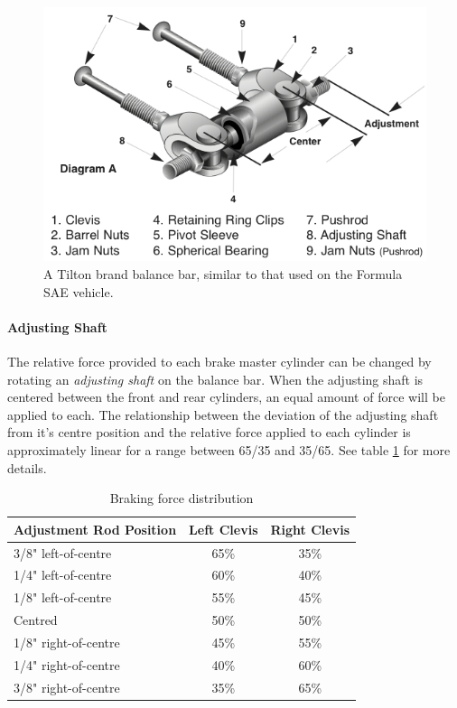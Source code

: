 \begin{figure}[h!]
	\centering
	 	\includegraphics[scale=1.0]{figures/balance_bar_diag.png}
    \caption{A Tilton brand balance bar, similar to that used on the Formula SAE vehicle.}
    \label{fig:balance_bar_diag}
\end{figure}

\paragraph{Adjusting Shaft}

The relative force provided to each brake master cylinder can be changed by rotating an \emph{adjusting shaft} on the balance bar. When the adjusting shaft is centered between the front and rear cylinders, an equal amount of force will be applied to each. The relationship between the deviation of the adjusting shaft from it's centre position and the relative force applied to each cylinder is approximately linear for a range between 65/35 and 35/65. See table \ref{table:bb_force_distribution} for more details.

\begin{table}[H]
	\centering
	\caption{Braking force distribution}
	\label{table:bb_force_distribution}	
	\begin{tabular}{| l | c | c |}
		\hline Adjustment Rod Position & Left Clevis & Right Clevis  \\ \hline
		\hline 3/8" left-of-centre & 65\% & 35\% \\ 
		\hline 1/4" left-of-centre & 60\% & 40\% \\
		\hline 1/8" left-of-centre & 55\% & 45\% \\
		\hline Centred & 50\% & 50\% \\
		\hline 1/8" right-of-centre & 45\% & 55\% \\
		\hline 1/4" right-of-centre & 40\% & 60\% \\
		\hline 3/8" right-of-centre & 35\% & 65\% \\
		\hline
	\end{tabular}
\end{table}

